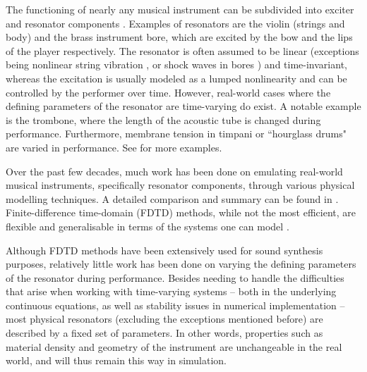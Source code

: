 \documentclass[fleqn]{jaes}
\begin{document}
The functioning of nearly any musical instrument can be subdivided into exciter and resonator components \cite{mcintyre1983oscillations, Borin1989}. Examples of resonators are the violin (strings and body) and the brass instrument bore, which are excited by the bow and the lips of the player respectively. The resonator is often assumed to be linear (exceptions being nonlinear string vibration \cite{Carrier1945}, or shock waves in bores \cite{Hirschberg1996}) and time-invariant, whereas the excitation is usually modeled as a lumped nonlinearity and can be controlled by the performer over time. However, real-world cases where the defining parameters of the resonator are time-varying do exist.
A notable example is the trombone, where the length of the acoustic tube is changed during performance. Furthermore, membrane tension in timpani or ``hourglass drums" %
are varied in performance. %
See \cite[Sec. 12.4]{Willemsen2021Thesis} for more examples. 

Over the past few decades, much work has been done on emulating real-world musical instruments, specifically resonator components, through various physical modelling techniques. A detailed comparison and summary can be found in \cite{valimaki2005discrete}. Finite-difference time-domain (FDTD) methods, while not the most efficient, are flexible and generalisable in terms of the systems one can model \cite{Bilbao2009}.

Although FDTD methods have been extensively used for sound synthesis purposes, relatively little work has been done on varying the defining parameters of the resonator during performance. Besides needing to handle the difficulties that arise when working with time-varying systems -- both in the underlying continuous equations, as well as stability issues in numerical implementation -- most physical resonators (excluding the exceptions mentioned before) are described by a fixed set of parameters. In other words, properties such as material density and geometry of the instrument are unchangeable in the real world, and will thus remain this way in simulation. %
\end{document}
